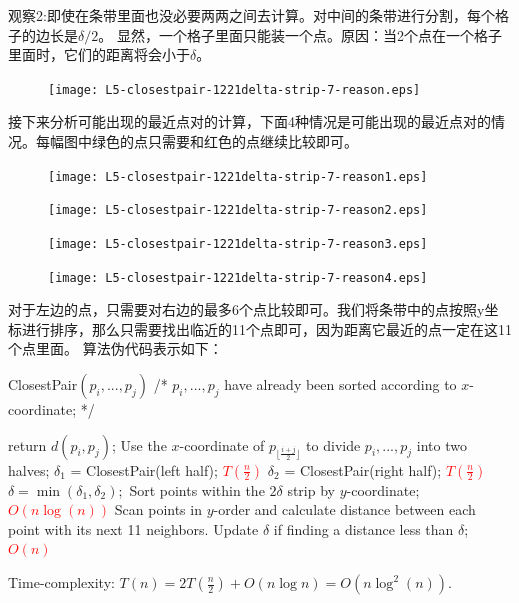 	观察2:即使在条带里面也没必要两两之间去计算。对中间的条带进行分割，每个格子的边长是$\delta/2$。	显然，一个格子里面只能装一个点。原因：当2个点在一个格子里面时，它们的距离将会小于$\delta$。
\begin{figure}[H]
\centering
 \texttt{[image: L5-closestpair-1221delta-strip-7-reason.eps]}
\end{figure}
	接下来分析可能出现的最近点对的计算，下面4种情况是可能出现的最近点对的情况。每幅图中绿色的点只需要和红色的点继续比较即可。
	
\begin{figure}[H]
\centering
 \texttt{[image: L5-closestpair-1221delta-strip-7-reason1.eps]}
\end{figure}

\begin{figure}
\centering
 \texttt{[image: L5-closestpair-1221delta-strip-7-reason2.eps]}
\end{figure}

\begin{figure}[H]
\centering
 \texttt{[image: L5-closestpair-1221delta-strip-7-reason3.eps]}
\end{figure}

\begin{figure}[H]
\centering
 \texttt{[image: L5-closestpair-1221delta-strip-7-reason4.eps]}
\end{figure}

	对于左边的点，只需要对右边的最多6个点比较即可。我们将条带中的点按照y坐标进行排序，那么只需要找出临近的11个点即可，因为距离它最近的点一定在这11个点里面。
	算法伪代码表示如下：

	{\sc ClosestPair}$( p_i, ..., p_j)$
/*  $p_i,...,p_j$ have already been sorted according to $x$-coordinate; */
\begin{algorithmic}[1]
\STATE return $d(p_{i}, p_{j})$;
\ENDIF
\STATE Use the $x$-coordinate of $p_{\lfloor\frac{i+j}{2}\rfloor}$ to divide $p_i,...,p_j$ into two halves; 
\STATE $\delta_1$ = {\sc ClosestPair}(left half);    \textcolor{red}{ $T(\frac{n}{2})$ } 
\STATE $\delta_2$ = {\sc ClosestPair}(right half);   \textcolor{red}{ $T(\frac{n}{2})$ } 
\STATE $\delta = \min( \delta_1, \delta_2);$
\STATE Sort points within the $2\delta$ strip  by $y$-coordinate; \textcolor{red}{ $O(n \log(n) )$ } 
\STATE Scan points in $y$-order and calculate distance between each point with its next 11 neighbors. Update $\delta$ if finding a distance less than $\delta$;  \textcolor{red}{$O(n)$}
\end{algorithmic}
	Time-complexity: $T(n)=2T(\frac{n}{2}) + O(n \log n) = O(n\log^2(n))$.
	
